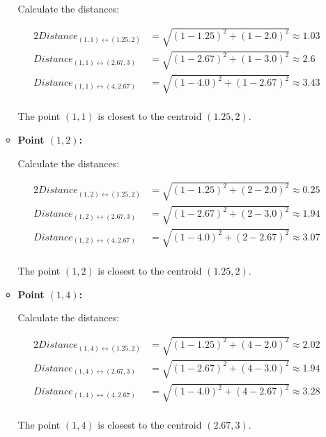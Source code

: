 \documentclass[
english,
smallborders
]{i6prcsht}
\begin{document}
\begin{solution}
\begin{enumerate}
\begin{itemize}
			            Calculate the distances:

			            \begin{alignat*}{2}
				            Distance_{(1,1)\leftrightarrow(1.25,2)} & = \sqrt{(1-1.25)^2+(1-2.0)^2} \approx 1.03 \\
				            Distance_{(1,1)\leftrightarrow(2.67,3)} & = \sqrt{(1-2.67)^2+(1-3.0)^2} \approx 2.6  \\
				            Distance_{(1,1)\leftrightarrow(4,2.67)} & = \sqrt{(1-4.0)^2+(1-2.67)^2} \approx 3.43 \\
			            \end{alignat*}

			            The point $(1,1)$ is closest to the centroid $(1.25,2)$.

			      \item \textbf{Point $(1,2)$:}

			            Calculate the distances:

			            \begin{alignat*}{2}
				            Distance_{(1,2)\leftrightarrow(1.25,2)} & = \sqrt{(1-1.25)^2+(2-2.0)^2} \approx 0.25 \\
				            Distance_{(1,2)\leftrightarrow(2.67,3)} & = \sqrt{(1-2.67)^2+(2-3.0)^2} \approx 1.94 \\
				            Distance_{(1,2)\leftrightarrow(4,2.67)} & = \sqrt{(1-4.0)^2+(2-2.67)^2} \approx 3.07 \\
			            \end{alignat*}

			            The point $(1,2)$ is closest to the centroid $(1.25,2)$.

			      \item \textbf{Point $(1,4)$:}

			            Calculate the distances:

			            \begin{alignat*}{2}
				            Distance_{(1,4)\leftrightarrow(1.25,2)} & = \sqrt{(1-1.25)^2+(4-2.0)^2} \approx 2.02 \\
				            Distance_{(1,4)\leftrightarrow(2.67,3)} & = \sqrt{(1-2.67)^2+(4-3.0)^2} \approx 1.94 \\
				            Distance_{(1,4)\leftrightarrow(4,2.67)} & = \sqrt{(1-4.0)^2+(4-2.67)^2} \approx 3.28 \\
			            \end{alignat*}

			            The point $(1,4)$ is closest to the centroid $(2.67,3)$.


\end{itemize}
\end{enumerate}
\end{solution}
\end{document}
